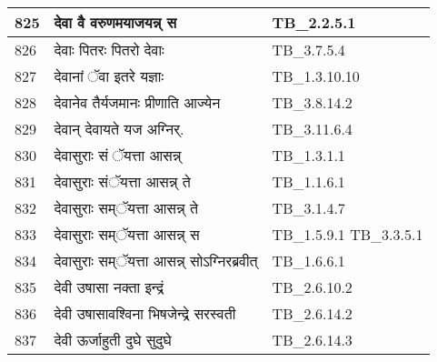 \documentclass[17pt]{extarticle}
\begin{document}
\begin{longtable}{||p{0.4in}||p{4.9in}||p{0.9in}||}
    \hline
        
    825 & देवा वै वरुणमयाजयन्न् स & TB\_2.2.5.1       \\
    
    \hline
        
    826 & देवाः पितरः पितरो देवाः & TB\_3.7.5.4       \\
    
    \hline
        
    827 & देवानां ॅवा इतरे यज्ञाः & TB\_1.3.10.10       \\
    
    \hline
        
    828 & देवानेव तैर्यजमानः प्रीणाति आज्येन & TB\_3.8.14.2       \\
    
    \hline
        
    829 & देवान् देवायते यज अग्निर्. & TB\_3.11.6.4       \\
    
    \hline
        
    830 & देवासुराः सं ॅयत्ता आसन्न् & TB\_1.3.1.1       \\
    
    \hline
        
    831 & देवासुराः संॅयत्ता आसन्न् ते & TB\_1.1.6.1       \\
    
    \hline
        
    832 & देवासुराः सम्ॅयत्ता आसन्न् ते & TB\_3.1.4.7       \\
    
    \hline
        
    833 & देवासुराः सम्ॅयत्ता आसन्न् स & TB\_1.5.9.1 TB\_3.3.5.1       \\
    
    \hline
        
    834 & देवासुराः सम्ॅयत्ता आसन्न् सोऽग्निरब्रवीत् & TB\_1.6.6.1       \\
    
    \hline
        
    835 & देवी उषासा नक्ता इन्द्रं & TB\_2.6.10.2       \\
    
    \hline
        
    836 & देवी उषासावश्विना भिषजेन्द्रे सरस्वती & TB\_2.6.14.2       \\
    
    \hline
        
    837 & देवी ऊर्जाहुती दुघे सुदुघे & TB\_2.6.14.3       \\
    

\end{longtable}
\end{document}
